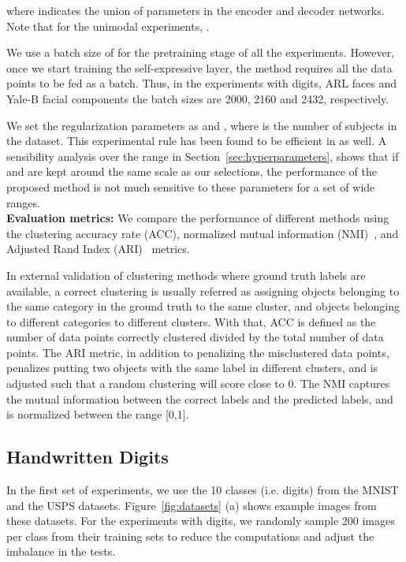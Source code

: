 \documentclass[journal]{IEEEtran}
\begin{document}
where  indicates the union of parameters in the encoder and decoder networks.		Note that for the unimodal experiments, .

We use a batch size of  for the pretraining stage of all the experiments.  However, once we start training the self-expressive layer, the method requires all the data points to be fed as a batch. Thus, in the experiments with digits, ARL faces and Yale-B facial components the batch sizes are 2000, 2160 and 2432, respectively.

We set the regularization parameters as  and ,  where  is the number of subjects in the dataset.   This experimental rule has been found to be efficient in \cite{deepsc17nips} as well.    A sensibility analysis over the range  in Section~\ref{sec:hyperparameters}, shows that if  and  are kept around the same scale as our selections, the performance of the proposed method is not much sensitive to these parameters for a set of wide ranges. \\

\noindent\textbf{Evaluation metrics: } We compare the performance of different methods using the clustering accuracy rate (ACC),  normalized mutual information (NMI)~\cite{vinh2010information}, and Adjusted Rand Index (ARI)~\cite{rand1971objective} metrics.

In external validation of clustering methods where ground truth labels are available,  a correct clustering is usually referred as assigning objects belonging to the same category in the ground truth to the same cluster, and objects belonging to different categories to different clusters.  With that, ACC is defined as the number of data points correctly clustered divided by the total number of data points.  The ARI metric, in addition to penalizing the misclustered data points, penalizes putting two objects with the same label in different clusters, and is adjusted such that a random clustering will score close to 0.   The NMI captures the mutual information between the correct labels and the predicted labels, and is normalized between the range [0,1].


\subsection{Handwritten Digits}
In the first set of experiments, we use the 10 classes (i.e. digits) from the  MNIST  and the USPS datasets.  Figure~\ref{fig:datasets} (a) shows example images from these datasets.		       For the experiments with digits, we randomly sample 200 images per class from their training sets to reduce the computations and adjust the imbalance in the tests.		    
\end{document}
